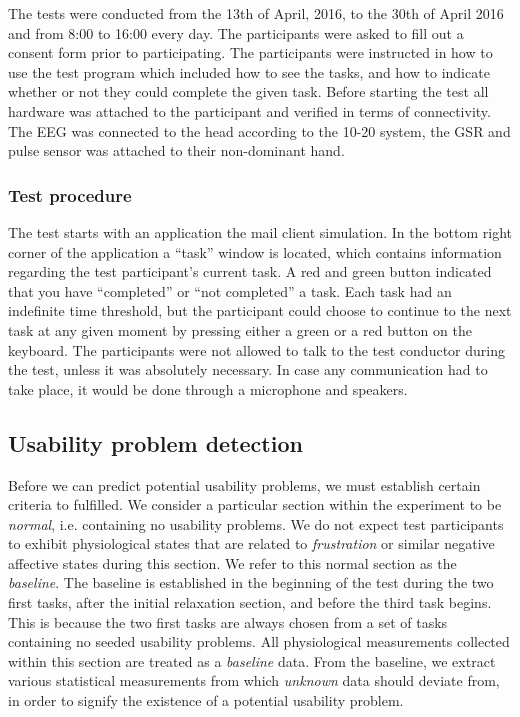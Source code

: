 The tests were conducted from the 13th of April, 2016, to the 30th of April 2016 and from 8:00 to 16:00 every day. 
The participants were asked to fill out a consent form prior to participating. 
The participants were instructed in how to use the test program which included how to see the tasks, and how to indicate whether or not they could complete the given task. 
Before starting the test all hardware was attached to the participant and verified in terms of connectivity. 
The EEG was connected to the head according to the 10-20 system\cite{eeg_tech_10_20}, the GSR and pulse sensor was attached to their non-dominant hand. 

\subsubsection{Test procedure}
The test starts with an application the mail client simulation.
In the bottom right corner of the application a ``task'' window is located, which contains information regarding the test participant's current task. 
A red and green button indicated that you have ``completed'' or ``not completed'' a task.  
Each task had an indefinite time threshold, but the participant could choose to continue to the next task at any given moment by pressing either a green or a red button on the keyboard. 
The participants were not allowed to talk to the test conductor during the test, unless it was absolutely necessary. 
In case any communication had to take place, it would be done through a microphone and speakers.

\subsection{Usability problem detection}
Before we can predict potential usability problems, we must establish certain criteria to fulfilled.  We consider a
particular section within the experiment to be \textit{normal}, i.e. containing no usability problems.  We do not expect
test participants to exhibit physiological states that are related to \textit{frustration} or similar negative affective
states during this section. We refer to this normal section as the \textit{baseline}. The baseline is established in the
beginning of the test during the two first tasks, after the initial relaxation section, and before the third task
begins. This is because the two first tasks are always chosen from a set of tasks containing no seeded usability
problems. All physiological measurements collected within this section are treated as a \textit{baseline} data.  From
the baseline, we extract various statistical measurements from which \textit{unknown} data should deviate from, in order
to signify the existence of a potential usability problem.

